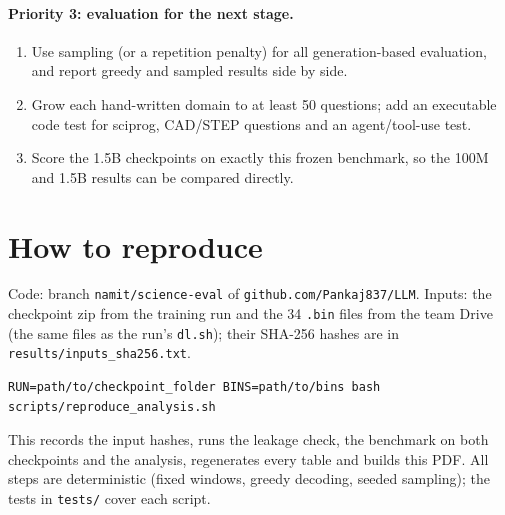 \documentclass[11pt,a4paper]{article}
\begin{document}
\paragraph{Priority 3: evaluation for the next stage.}
\begin{enumerate}
\item Use sampling (or a repetition penalty) for all generation-based evaluation, and report greedy and sampled results side by side.
\item Grow each hand-written domain to at least 50 questions; add an executable code test for sciprog, CAD/STEP questions and an agent/tool-use test.
\item Score the 1.5B checkpoints on exactly this frozen benchmark, so the 100M and 1.5B results can be compared directly.
\end{enumerate}

\section{How to reproduce}\label{sec:repro}
Code: branch \texttt{namit/science-eval} of \texttt{github.com/Pankaj837/LLM}. Inputs: the checkpoint zip from the training run and the 34
\texttt{.bin} files from the team Drive (the same files as the run's \texttt{dl.sh}); their SHA-256 hashes are in \texttt{results/inputs\_sha256.txt}.
\begin{verbatim}
RUN=path/to/checkpoint_folder BINS=path/to/bins bash scripts/reproduce_analysis.sh
\end{verbatim}
This records the input hashes, runs the leakage check, the benchmark on both checkpoints and the analysis, regenerates every table and builds this
PDF. All steps are deterministic (fixed windows, greedy decoding, seeded sampling); the tests in \texttt{tests/} cover each script.
\end{document}
